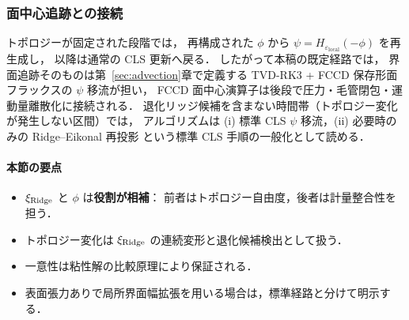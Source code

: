 \subsubsection{面中心追跡との接続}
\label{sec:ridge_fccd_handoff}

トポロジーが固定された段階では，
再構成された $\phi$ から $\psi = H_{\varepsilon_\text{local}}(-\phi)$ を再生成し，
以降は通常の CLS 更新へ戻る．
したがって本稿の既定経路では，
界面追跡そのものは第~\ref{sec:advection}章で定義する
TVD-RK3 + FCCD 保存形面フラックスの $\psi$ 移流が担い，
FCCD 面中心演算子は後段で圧力・毛管閉包・運動量離散化に接続される．
退化リッジ候補を含まない時間帯（トポロジー変化が発生しない区間）では，
アルゴリズムは
(i) 標準 CLS $\psi$ 移流，(ii) 必要時のみの Ridge--Eikonal 再投影
という標準 CLS 手順の一般化として読める．

\paragraph{本節の要点}
\begin{itemize}
  \item $\xi_{\text{Ridge}}$ と $\phi$ は\textbf{役割が相補}：
        前者はトポロジー自由度，後者は計量整合性を担う．
  \item トポロジー変化は $\xi_{\text{Ridge}}$ の連続変形と退化候補検出として扱う．
  \item 一意性は粘性解の比較原理により保証される．
  \item 表面張力ありで局所界面幅拡張を用いる場合は，標準経路と分けて明示する．
\end{itemize}
